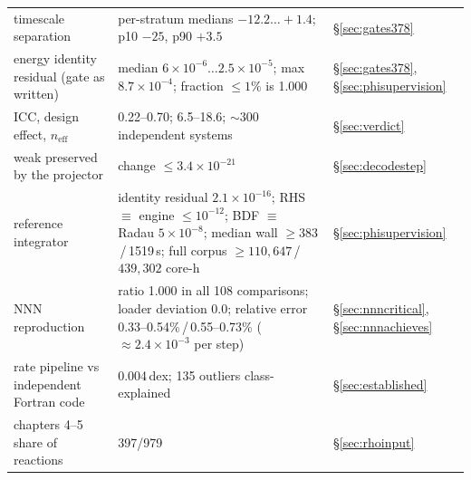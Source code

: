 \begin{longtable}{@{}L{6.4cm} L{5.0cm} L{3.2cm}@{}}
timescale separation &
  per-stratum medians $-12.2\ldots+1.4$; p10 $-25$, p90 $+3.5$ &
  \S\ref{sec:gates378} \\
energy identity residual (gate as written) &
  median $6\times10^{-6}\ldots2.5\times10^{-5}$; max $8.7\times10^{-4}$;
  fraction $\le 1\%$ is 1.000 & \S\ref{sec:gates378}, \S\ref{sec:phisupervision} \\
ICC, design effect, $n_{\mathrm{eff}}$ &
  0.22--0.70; 6.5--18.6; ${\sim}300$ independent systems & \S\ref{sec:verdict} \\
weak \dYe{} preserved by the projector &
  change $\le 3.4\times10^{-21}$ & \S\ref{sec:decodestep} \\
reference integrator &
  identity residual $2.1\times10^{-16}$; RHS $\equiv$ engine $\le 10^{-12}$;
  BDF $\equiv$ Radau $5\times10^{-8}$; median wall $\ge 383$\,/\,1519\,s;
  full corpus $\ge 110{,}647$\,/\,$439{,}302$ core-h & \S\ref{sec:phisupervision} \\
NNN reproduction &
  ratio 1.000 in all 108 comparisons; loader deviation 0.0; relative \Ye{}
  error 0.33--0.54\%\,/\,0.55--0.73\% ($\approx 2.4\times10^{-3}$ per step)
  & \S\ref{sec:nnncritical}, \S\ref{sec:nnnachieves} \\
rate pipeline vs independent Fortran code &
  0.004\,dex; 135 outliers class-explained & \S\ref{sec:established} \\
chapters 4--5 share of reactions &
  397/979 & \S\ref{sec:rhoinput} \\
\end{longtable}
\endgroup

\clearpage
\tableofcontents
\clearpage

